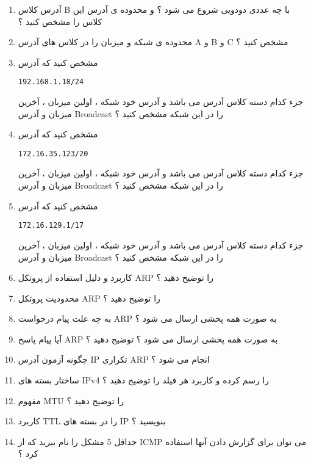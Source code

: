 \documentclass{article}
\begin{document}
\begin{enumerate}
\item آدرس کلاس B با چه عددی دودویی شروع می شود ؟ و محدوده ی آدرس این کلاس را مشخص کنید ؟

\item محدوده ی شبکه و میزبان را در کلاس های آدرس A و B و C مشخص کنید ؟

\item مشخص کنید که آدرس 
\begin{lstlisting}
192.168.1.18/24
\end{lstlisting}
جزء کدام دسته کلاس آدرس می باشد و آدرس خود شبکه ، اولین میزبان ، آخرین میزبان و آدرس Broadcast را در این شبکه مشخص کنید ؟

\item مشخص کنید که آدرس 
\begin{lstlisting}
172.16.35.123/20
\end{lstlisting}
جزء کدام دسته کلاس آدرس می باشد و آدرس خود شبکه ، اولین میزبان ، آخرین میزبان و آدرس Broadcast را در این شبکه مشخص کنید ؟

\item مشخص کنید که آدرس 
\begin{lstlisting}
172.16.129.1/17
\end{lstlisting}
جزء کدام دسته کلاس آدرس می باشد و آدرس خود شبکه ، اولین میزبان ، آخرین میزبان و آدرس Broadcast را در این شبکه مشخص کنید ؟



\item کاربرد و دلیل استفاده از پروتکل ARP را توضیح دهید ؟

\item محدودیت پروتکل ARP را توضیح دهید ؟

\item به چه علت پیام درخواست ARP به صورت همه پخشی ارسال می شود ؟

\item آیا پیام پاسخ ARP به صورت همه پخشی ارسال می شود ؟ توضیح دهید ؟

\item چگونه آزمون آدرس IP تکراری ARP انجام می شود ؟

\item ساختار بسته های IPv4 را رسم کرده و کاربرد هر فیلد را توضیح دهید ؟

\item مفهوم MTU را توضیح دهید ؟

\item کاربرد TTL را در بسته های IP بنویسید ؟

\item حداقل 5 مشکل را نام ببرید که از ICMP می توان برای گزارش دادن آنها استفاده کرد ؟


\end{enumerate}
\end{document}
